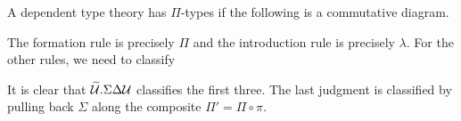 \documentclass{amsart}
\begin{document}
A dependent type theory has $\Pi$-types if the following is a commutative diagram.


The formation rule is precisely $\Pi$ and the introduction rule is precisely $\lambda$.
For the other rules, we need to classify
It is clear that $\widetilde{\mathcal{U}}.\Sigma\Delta\mathcal{U}$ classifies the first three.
The last judgment is classified by pulling back $\Sigma$ along the composite $\Pi' = \Pi \circ \pi$.





\end{document}
